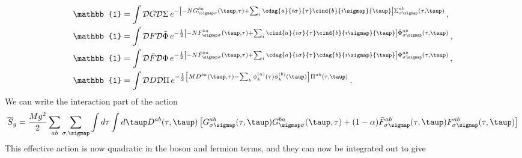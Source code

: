 %
\begin{subequations} 
\begin{align}
    \mathbb{1} &= \int\mathcal{D}G\mathcal{D}\Sigma\, e^{-\left[-NG^{ba}_{\sigmap\sigma}(\taup,\tau) + \sum_i\cdag{a}{i\sigma}{\tau}\cind{b}{i\sigmap}{\taup}\right]\Sigma^{ab}_{\sigma\sigmap}(\tau,\taup)} \,,\label{eq:LMGS}\\
    \mathbb{1} &= \int\mathcal{D}F\mathcal{D}\Bar{\Phi}\, e^{-\frac{1}{2}\left[-NF^{ba}_{\sigmap\sigma}(\taup,\tau) + \sum_i\cind{a}{i\sigma}{\tau}\cind{b}{i\sigmap}{\taup}\right]{\Bar{\Phi}}^{ab}_{\sigma\sigmap}(\tau,\taup)}\,,\label{eq:LMFPhib} \\
    \mathbb{1} &= \int\mathcal{D}\Bar{F}\mathcal{D}\Phi\, e^{-\frac{1}{2}\left[-N{\Bar{F}}^{ba}_{\sigmap\sigma}(\taup,\tau) + \sum_i\cdag{a}{i\sigma}{\tau}\cdag{b}{i\sigmap}{\taup}\right]{\Phi}^{ab}_{\sigma\sigmap}(\tau,\taup)} \,,\label{eq:LMFbPhi}\\
    \mathbb{1} &= \int\mathcal{D}D\mathcal{D}\Pi\, e^{-\frac{1}{2}\left[MD^{ba}(\taup,\tau) - \sum_k\phi_k^{(a)}(\tau)\phi^{(b)}_{k}(\taup)\right]\Pi^{ab}(\tau,\taup)} \,. \label{eq:LMDPi}
\end{align}
\end{subequations}
%
We can write the interaction part of the action 
\begin{align}
    \overline{S}_g = \frac{M g^2}{2}\sum_{ab}\sum_{\sigma,\sigmap}\int d\tau \int d\taup D^{ab}(\tau,\taup)\left[G^{ab}_{\sigma\sigmap}(\tau,\taup)G^{ba}_{\sigmap\sigma}(\taup,\tau) + (1-\alpha)\Bar{F}^{ab}_{\sigma\sigmap}(\tau,\taup)F_{\sigma\sigmap}^{ab}(\tau,\taup)\right] 
\end{align}
%
This effective action is now quadratic in the boson and fermion terms, and they can now be integrated out to give
%
